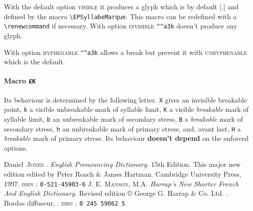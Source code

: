 \documentclass[a4paper]{article}
\newcommand\Option[1]{\textsc{#1}}
\begin{document}
With the default option \Option{visible} it produces a glyph which is
by default [.] and defined by the macro
\verb+\EPSyllabeMarque+.  This macro can be redefined with a
\verb+\renewcommand+ if necessary. With option \Option{invisible} \verb+^^a3k+
doesn't produce any glyph.

With option \Option{hyphenable} \verb+^^a3k+ allows a break but prevent it
with \Option{unhyphenable} which is the default.
\paragraph{Macro \texttt{^^a3K}} Its behaviour is determined by the
following letter. \texttt{X} gives an invisible breakable point,
\texttt{k} a visible unbreakable mark of syllable limit, \texttt{K} a
visible \emph{breakable} mark of syllable limit, \texttt{b} an
unbreakable mark of secondary stress, \texttt{B} a \emph{breakable}
mark of secondary stress, \texttt{h} an unbreakable mark of primary
stress, and, avant last, \texttt{H} a \emph{breakable} mark of primary
stress. Its behaviour \textbf{doesn't depend} on the enforced options.

\begin{thebibliography}{99}
 Daniel~\textsc{Jones} \dag.
\emph{English Pronouncing Dictionary}.
15th Edition. This major new edition edited by Peter Roach \& James
Hartman.
Cambridge University Press, 1997.
\textsc{isbn} : \texttt{0-521-45903-6}
 J. E. \textsc{Manson}, M.A.
\emph{Harrap's New Shorter French And English Dictionary.}
Revised edition \copyright{} George G. Harrap \&
Co. Ltd. .
Bordas diffuseur, .
\textsc{isbn} : \texttt{0 245 59062 5}
\end{thebibliography}
\newpage

\end{document}
